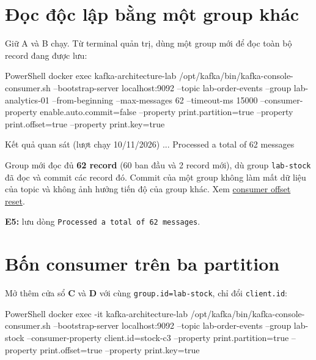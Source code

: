 \section{Đọc độc lập bằng một group khác}

Giữ A và B chạy. Từ terminal quản trị, dùng một group mới để đọc toàn bộ record đang được lưu:


\begin{aivncodebox}[language={}]{PowerShell}
docker exec kafka-architecture-lab /opt/kafka/bin/kafka-console-consumer.sh --bootstrap-server localhost:9092 --topic lab-order-events --group lab-analytics-01 --from-beginning --max-messages 62 --timeout-ms 15000 --consumer-property enable.auto.commit=false --property print.partition=true --property print.offset=true --property print.key=true
\end{aivncodebox}

\begin{aivnCodeOutput}{Kết quả quan sát (lượt chạy 10/11/2026)}
...
Processed a total of 62 messages
\end{aivnCodeOutput}

Group mới đọc đủ \textbf{62 record} (60 ban đầu và 2 record mới), dù group \texttt{lab-\allowbreak{}stock} đã đọc và commit các record đó. Commit của một group không làm mất dữ liệu của topic và không ảnh hưởng tiến độ của group khác. Xem \href{https://kafka.apache.org/41/configuration/consumer-configs/}{consumer offset reset}.


\begin{evidencebox}
\textbf{E5:} lưu dòng \texttt{Processed a total of 62 messages}.
\end{evidencebox}

\section{Bốn consumer trên ba partition}

Mở thêm cửa sổ \textbf{C} và \textbf{D} với cùng \texttt{group.\allowbreak{}id=\allowbreak{}lab-\allowbreak{}stock}, chỉ đổi \texttt{client.\allowbreak{}id}:


\begin{aivncodebox}[language={}]{PowerShell}
docker exec -it kafka-architecture-lab /opt/kafka/bin/kafka-console-consumer.sh --bootstrap-server localhost:9092 --topic lab-order-events --group lab-stock --consumer-property client.id=stock-c3 --property print.partition=true --property print.offset=true --property print.key=true
\end{aivncodebox}

